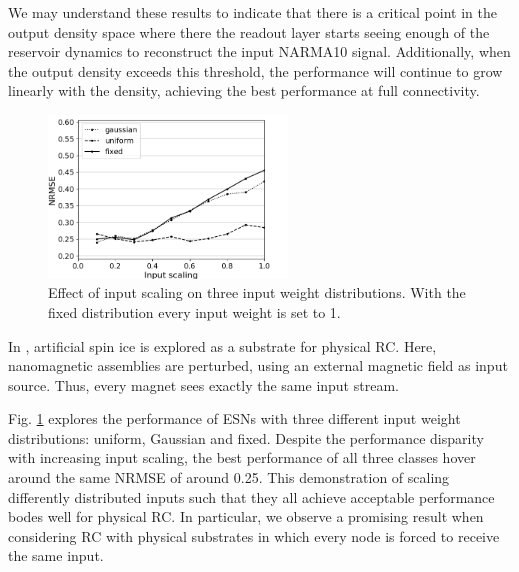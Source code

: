We may understand these results to indicate that there is a critical point in
the output density space where there the readout layer starts seeing enough of
the reservoir dynamics to reconstruct the input NARMA10 signal. Additionally,
when the output density exceeds this threshold, the performance will continue to
grow linearly with the density, achieving the best performance at full
connectivity.


\begin{figure}[H]
  \centering
  \includegraphics[width=2.5in]{img/input_scaling_distrib.png}
  \caption{
    Effect of input scaling on three input weight distributions. With the fixed
distribution every input weight is set to 1.
  }
  \label{input_scaling_distrib}
\end{figure}

In \cite{jensen_computation_2018}, artificial spin ice is explored as a
substrate for physical RC. Here, nanomagnetic assemblies are perturbed, using an
external magnetic field as input source. Thus, every magnet sees exactly the
same input stream.

Fig. \ref{input_scaling_distrib} explores the performance of ESNs with three
different input weight distributions: uniform, Gaussian and fixed. Despite the
performance disparity with increasing input scaling, the best performance of all
three classes hover around the same NRMSE of around 0.25. This demonstration of
scaling differently distributed inputs such that they all achieve acceptable
performance bodes well for physical RC. In particular, we observe a promising
result when considering RC with physical substrates in which every node is
forced to receive the same input.

